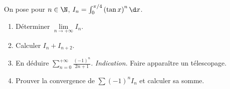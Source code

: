 \begin{enonce}
\begin{exercise}[ID={RMS133 E1383},subtitle={CCINP PSI 2022},tags={},difficulty={}]
  On pose pour $n\in\N$, $I_n = \int_0^{\pi/4} \left( \tan x \right)^n \d x$.
  \begin{enumerate}
    \item Déterminer $\lim\limits_{n\to+\infty} I_n$.
    \item Calculer $I_n + I_{n+2}$.
    \item En déduire $\sum\limits_{n=0}^{+\infty} \frac{(-1)^n}{2n+1}$.
      \emph{Indication.} Faire apparaître un télescopage.

    \item Prouver la convergence de $\sum (-1)^n I_n$ et calculer sa somme.
  \end{enumerate}
\end{exercise}
\begin{solution}
\end{solution}
\end{enonce}
